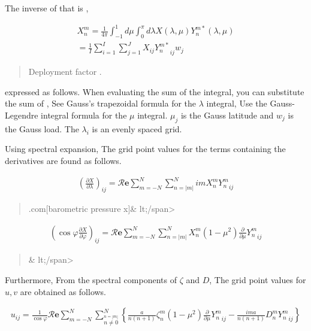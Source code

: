 The inverse of that is ,

\begin{eqnarray}
  X_n^m
         =  \frac{1}{4 \pi}
             \int_{-1}^{1} d \mu \int_{0}^{\pi} d \lambda
               X( \lambda, \mu ) Y_n^{m *} ( \lambda, \mu ) \\
         =  \frac{1}{I} \sum_{i=1}^{I} \sum_{j=1}^{J}  
               X_{ij} {Y_n^{m*}}_{ij} w_j
\end{eqnarray}

\begin{quote}
\protect\hypertarget{Deploymentux20factor}{}{\blendon{[}Deployment
factor }.
\end{quote}

expressed as follows. When evaluating the sum of the integral, you can
substitute the sum of , See Gauss's trapezoidal formula for the
\(\lambda\) integral, Use the Gauss-Legendre integral formula for the
\(\mu\) integral. \(\mu_j\) is the Gauss latitude and \(w_j\) is the
Gauss load. The \(\lambda_i\) is an evenly spaced grid.

Using spectral expansion, The grid point values for the terms containing
the derivatives are found as follows.

\begin{eqnarray}
        \left(  \frac{\partial X}{\partial \lambda} \right)_{ij}
     =  
        {\mathcal R}\mathbf{e} \sum_{m=-N}^{N} \sum_{n=|m|}^{N}
       im X_n^m {Y_n^m}_{ij}
\end{eqnarray}

\begin{quote}
\blazer.com{[}barometric pressure x{]}\& lt;/span\textgreater{}
\end{quote}

\begin{eqnarray}
   \left( \cos\varphi \frac{\partial X}{\partial \varphi} \right)_{ij}
     =  {\mathcal R}\mathbf{e} \sum_{m=-N}^{N} \sum_{n=|m|}^{N}
       X_n^m
       ( 1-\mu^{2} ) \frac{\partial }{\partial \mu} {Y_n^m}_{ij}
\end{eqnarray}

\begin{quote}
\& lt;/span\textgreater{}
\end{quote}

Furthermore, From the spectral components of \(\zeta\) and \(D\), The
grid point values for \(u,v\) are obtained as follows.

\begin{eqnarray}
  u_{ij}
  = \frac{1}{\cos\varphi}
     {\mathcal R}\mathbf{e} \sum_{m=-N}^{N}
                       \sum_{\stackrel{n=|m|}{n \neq 0}}^{N}
    \left\{
             \frac{a}{n(n+1)} \zeta_n^m
            (1-\mu^{2}) \frac{\partial }{\partial \mu} {Y_n^m}_{ij}
          -  \frac{im a}{n(n+1)} D_n^m {Y_n^m}_{ij}
    \right\}
\end{eqnarray}

